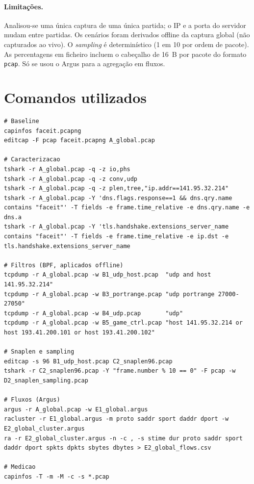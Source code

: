 \documentclass[a4paper,11pt]{article}
\begin{document}
\paragraph{Limitações.} Analisou-se uma única captura de uma única partida; o IP e a porta do servidor mudam entre
partidas. Os cenários foram derivados offline da captura global (não capturados ao vivo). O \emph{sampling} é determinístico
(1 em 10 por ordem de pacote). As percentagens em ficheiro incluem o cabeçalho de 16~B por pacote do formato \texttt{pcap}.
Só se usou o Argus para a agregação em fluxos.

\appendix
\section{Comandos utilizados}
\begin{lstlisting}
# Baseline
capinfos faceit.pcapng
editcap -F pcap faceit.pcapng A_global.pcap

# Caracterizacao
tshark -r A_global.pcap -q -z io,phs
tshark -r A_global.pcap -q -z conv,udp
tshark -r A_global.pcap -q -z plen,tree,"ip.addr==141.95.32.214"
tshark -r A_global.pcap -Y 'dns.flags.response==1 && dns.qry.name contains "faceit"' -T fields -e frame.time_relative -e dns.qry.name -e dns.a
tshark -r A_global.pcap -Y 'tls.handshake.extensions_server_name contains "faceit"' -T fields -e frame.time_relative -e ip.dst -e tls.handshake.extensions_server_name

# Filtros (BPF, aplicados offline)
tcpdump -r A_global.pcap -w B1_udp_host.pcap  "udp and host 141.95.32.214"
tcpdump -r A_global.pcap -w B3_portrange.pcap "udp portrange 27000-27050"
tcpdump -r A_global.pcap -w B4_udp.pcap       "udp"
tcpdump -r A_global.pcap -w B5_game_ctrl.pcap "host 141.95.32.214 or host 193.41.200.101 or host 193.41.200.102"

# Snaplen e sampling
editcap -s 96 B1_udp_host.pcap C2_snaplen96.pcap
tshark -r C2_snaplen96.pcap -Y "frame.number % 10 == 0" -F pcap -w D2_snaplen_sampling.pcap

# Fluxos (Argus)
argus -r A_global.pcap -w E1_global.argus
racluster -r E1_global.argus -m proto saddr sport daddr dport -w E2_global_cluster.argus
ra -r E2_global_cluster.argus -n -c , -s stime dur proto saddr sport daddr dport spkts dpkts sbytes dbytes > E2_global_flows.csv

# Medicao
capinfos -T -m -M -c -s *.pcap
\end{lstlisting}
\end{document}
